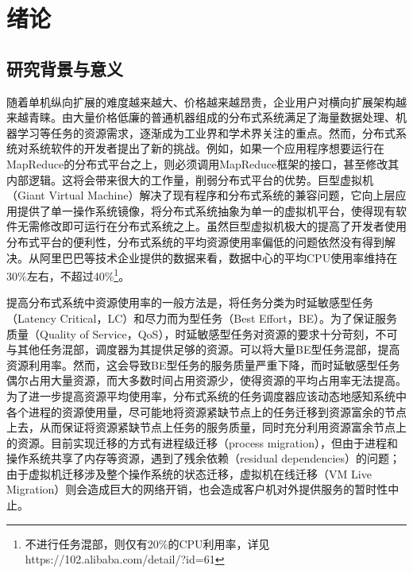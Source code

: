 
\chapter{绪论}
\label{chap:Intro}
\section{研究背景与意义}
随着单机纵向扩展的难度越来越大、价格越来越昂贵，企业用户对横向扩展架构越来越青睐。由大量价格低廉的普通机器组成的分布式系统满足了海量数据处理、机器学习等任务的资源需求，逐渐成为工业界和学术界关注的重点。然而，分布式系统对系统软件的开发者提出了新的挑战。例如，如果一个应用程序想要运行在MapReduce\cite{MapReduce}的分布式平台之上，则必须调用MapReduce框架的接口，甚至修改其内部逻辑。这将会带来很大的工作量，削弱分布式平台的优势。巨型虚拟机（Giant Virtual Machine）\cite{giantvm}解决了现有程序和分布式系统的兼容问题，它向上层应用提供了单一操作系统镜像，将分布式系统抽象为单一的虚拟机平台，使得现有软件无需修改即可运行在分布式系统之上。虽然巨型虚拟机极大的提高了开发者使用分布式平台的便利性，分布式系统的平均资源使用率偏低的问题依然没有得到解决。从阿里巴巴等技术企业提供的数据来看，数据中心的平均CPU使用率维持在30\%左右，不超过40\%\footnote{不进行任务混部，则仅有20\%的CPU利用率，详见https://102.alibaba.com/detail/?id=61}。

提高分布式系统中资源使用率的一般方法是，将任务分类为时延敏感型任务（Latency Critical，LC）和尽力而为型任务（Best Effort，BE）。为了保证服务质量（Quality of Service，QoS），时延敏感型任务对资源的要求十分苛刻，不可与其他任务混部，调度器为其提供足够的资源。可以将大量BE型任务混部，提高资源利用率。然而，这会导致BE型任务的服务质量严重下降，而时延敏感型任务偶尔占用大量资源，而大多数时间占用资源少，使得资源的平均占用率无法提高。为了进一步提高资源平均使用率，分布式系统的任务调度器应该动态地感知系统中各个进程的资源使用量，尽可能地将资源紧缺节点上的任务迁移到资源富余的节点上去，从而保证将资源紧缺节点上任务的服务质量，同时充分利用资源富余节点上的资源。目前实现迁移的方式有进程级迁移（process migration），但由于进程和操作系统共享了内存等资源，遇到了残余依赖（residual dependencies）\cite{residual}的问题；由于虚拟机迁移涉及整个操作系统的状态迁移，虚拟机在线迁移（VM Live Migration）\cite{livemigration}则会造成巨大的网络开销，也会造成客户机对外提供服务的暂时性中止。

